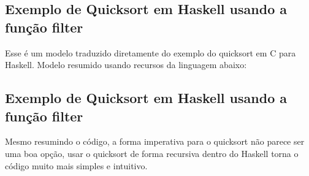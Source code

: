 \subsection{Exemplo de Quicksort em Haskell usando a função filter}



Esse é um modelo traduzido diretamente do exemplo do quicksort em C para Haskell. Modelo resumido usando recursos da linguagem
abaixo:

\subsection{Exemplo de Quicksort em Haskell usando a função filter} 



Mesmo resumindo o código, a forma imperativa para o quicksort não parece ser uma boa opção, usar o quicksort de forma recursiva
dentro do Haskell torna o código muito mais simples e intuitivo.

\nocite{beginnersbook}
\nocite{qastack}
\nocite{haskellreport98}
\nocite{progfuncional}

\newpage